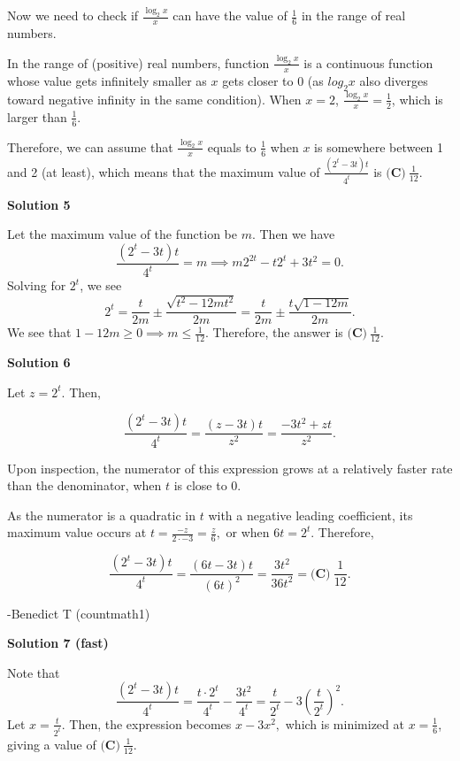 \begin{enumerate}
 
Now we need to check if $\frac{\log_2{x}}{x}$ can have the value of $\frac{1}{6}$ in the range of real numbers.

 In the range of (positive) real numbers, function $\frac{\log_2{x}}{x}$ is a continuous function whose value gets infinitely smaller as $x$ gets closer to 0 (as $log_2{x}$ also diverges toward negative infinity in the same condition). When $x = 2$, $\frac{\log_2{x}}{x} = \frac{1}{2}$, which is larger than $\frac{1}{6}$.

 Therefore, we can assume that $\frac{\log_2{x}}{x}$ equals to $\frac{1}{6}$ when $x$ is somewhere between 1 and 2 (at least), which means that the maximum value of $\frac{(2^t-3t)t}{4^t}$ is $\boxed{\textbf{(C)}\ \frac{1}{12}}$.

 



\textbf{Solution 5}

Let the maximum value of the function be $m$. Then we have 
 \[\frac{(2^t-3t)t}{4^t} = m \implies m2^{2t} - t2^t + 3t^2 = 0.\]Solving for $2^{t}$, we see 
 \[2^{t} = \frac{t}{2m} \pm \frac{\sqrt{t^2 - 12mt^2}}{2m} = \frac{t}{2m} \pm \frac{t\sqrt{1 - 12m}}{2m}.\] We see that $1 - 12m \geq 0 \implies m \leq \frac{1}{12}.$ Therefore, the answer is $\boxed{\textbf{(C)}\ \frac{1}{12}}$.

 



\textbf{Solution 6}

Let $z=2^t.$ Then, 

 
 \[\frac{\left(2^t-3t\right)t}{4^t}=\frac{\left(z-3t\right)t}{z^2} = \frac{-3t^2+zt}{z^2}.\]

 Upon inspection, the numerator of this expression grows at a relatively faster rate than the denominator, when $t$ is close to $0$.

 As the numerator is a quadratic in $t$ with a negative leading coefficient, its maximum value occurs at $t=\frac{-z}{2\cdot -3}=\frac{z}{6},$ or when $6t=2^t.$ Therefore, 

 
 \[\frac{\left(2^t-3t\right)t}{4^t}=\frac{\left(6t-3t\right)t}{(6t)^2}=\frac{3t^2}{36t^2}=\boxed{\textbf{(C)}\ \frac{1}{12}}.\]

 
-Benedict T (countmath1)

 



\textbf{Solution 7 (fast)}

Note that
 \[\dfrac{(2^t-3t)t}{4^t}=\dfrac{t\cdot 2^t}{4^t}-\dfrac{3t^2}{4^t}=\dfrac{t}{2^t}-3\left(\dfrac{t}{2^t}\right)^2.\]Let $x=\frac{t}{2^t}.$ Then, the expression becomes $x-3x^2,$ which is minimized at $x=\frac{1}{6}$, giving a value of $\boxed{\textbf{(C)}\ \frac{1}{12}}.$


\end{enumerate}
